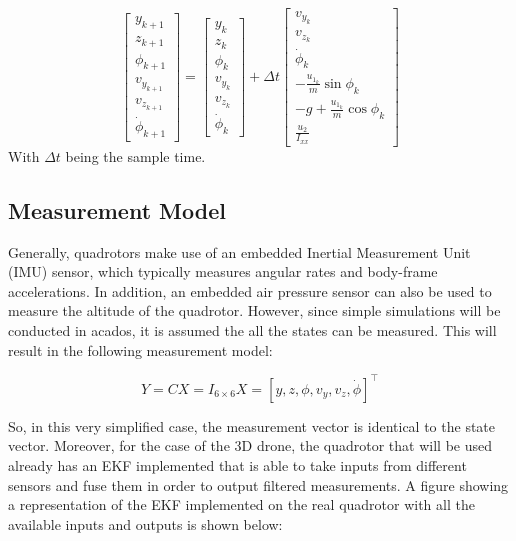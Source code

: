 \documentclass{thesisreport}
\begin{document}
\begin{equation}\label{evolution_model}
        \begin{bmatrix}
            y_{k+1} \\ z_{k+1} \\ \phi_{k+1} \\ v_{y_{k+1}} \\ v_{z_{k+1}} \\ \dot{\phi}_{k+1} 
        \end{bmatrix} = 
        \begin{bmatrix}
            y_{k} \\ z_{k} \\ \phi_{k} \\ v_{y_{k}} \\ v_{z_{k}} \\ \dot{\phi}_{k} 
        \end{bmatrix}
        + \Delta t \begin{bmatrix} 
            v_{y_{k}} \\ v_{z_{k}} \\ \dot{\phi}_{k} \\ -\frac{u_{1_k}}{m} \sin \phi_k \\ -g + \frac{u_{1_k}}{m} \cos \phi_k \\ \frac{u_2}{I_{xx}}
        \end{bmatrix}
    \end{equation}
With $\Delta t$ being the sample time.

\newpage    
    
	\subsection{Measurement Model}
	
	Generally, quadrotors make use of an embedded Inertial Measurement Unit (IMU) sensor, which typically measures angular rates and body-frame accelerations. In addition, an embedded air pressure sensor can also be used to measure the altitude of the quadrotor. However, since simple simulations will be conducted in acados, it is assumed the all the states can be measured. This will result in the following measurement model:
	
	\begin{equation}\label{measurement_model}
        Y = CX = I_{6 \times 6} X = [y, z, \phi, v_y, v_z, \dot{\phi}]^{\intercal}
    \end{equation}

So, in this very simplified case, the measurement vector is identical to the state vector.
Moreover, for the case of the 3D drone, the quadrotor that will be used already has an EKF implemented that is able to take inputs from different sensors and fuse them in order to output filtered measurements.
A figure showing a representation of the EKF implemented on the real quadrotor with all the available inputs and outputs is shown below:
\end{document}
